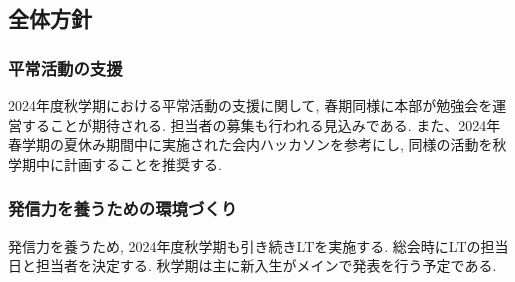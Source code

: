 \subsection*{全体方針}


\subsubsection*{平常活動の支援}
2024年度秋学期における平常活動の支援に関して, 春期同様に本部が勉強会を運営することが期待される.
担当者の募集も行われる見込みである.
また、2024年春学期の夏休み期間中に実施された会内ハッカソンを参考にし, 同様の活動を秋学期中に計画することを推奨する.

\subsubsection*{発信力を養うための環境づくり}
発信力を養うため, 2024年度秋学期も引き続きLTを実施する.
総会時にLTの担当日と担当者を決定する. 
秋学期は主に新入生がメインで発表を行う予定である.

